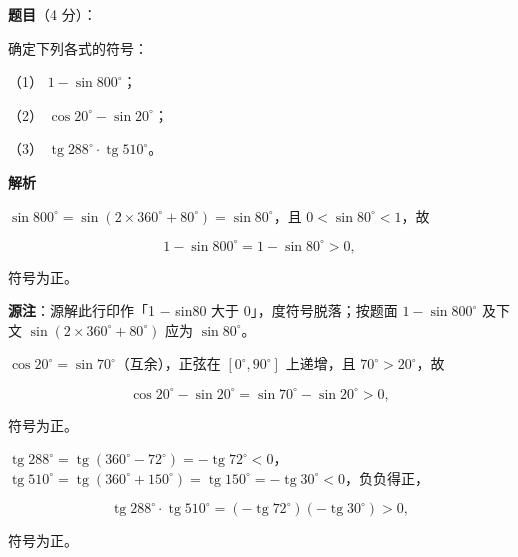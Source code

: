 \begin{answer}

\textbf{题目}（4 分）：

确定下列各式的符号：

（1） $1-\sin800^\circ$；

（2） $\cos20^\circ-\sin20^\circ$；

（3） $\operatorname{tg}288^\circ\cdot\operatorname{tg}510^\circ$。

\textbf{解析}


$\sin800^\circ=\sin(2\times360^\circ+80^\circ)=\sin80^\circ$，且 $0<\sin80^\circ<1$，故

\nopagebreak[4]
\[
1-\sin800^\circ=1-\sin80^\circ>0,
\]

符号为正。

\begin{gktip}
\textbf{源注}：源解此行印作「1 $-$ sin80 大于 0」，度符号脱落；按题面 $1-\sin800^\circ$ 及下文 $\sin(2\times360^\circ+80^\circ)$ 应为 $\sin80^\circ$。
\end{gktip}


$\cos20^\circ=\sin70^\circ$（互余），正弦在 $[0^\circ,90^\circ]$ 上递增，且 $70^\circ>20^\circ$，故

\nopagebreak[4]
\[
\cos20^\circ-\sin20^\circ=\sin70^\circ-\sin20^\circ>0,
\]

符号为正。


$\operatorname{tg}288^\circ=\operatorname{tg}(360^\circ-72^\circ)=-\operatorname{tg}72^\circ<0$，$\operatorname{tg}510^\circ=\operatorname{tg}(360^\circ+150^\circ)=\operatorname{tg}150^\circ=-\operatorname{tg}30^\circ<0$，负负得正，

\nopagebreak[4]
\[
\operatorname{tg}288^\circ\cdot\operatorname{tg}510^\circ
=(-\operatorname{tg}72^\circ)(-\operatorname{tg}30^\circ)>0,
\]

符号为正。




\end{answer}
